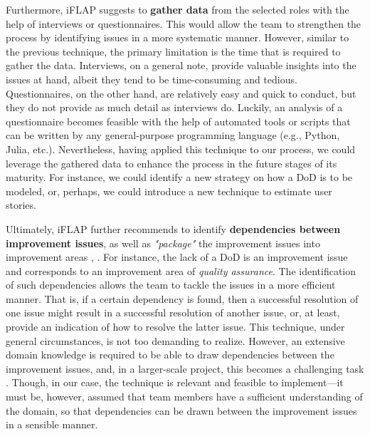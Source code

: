 \documentclass[conference]{IEEEtran}
\begin{document}
Furthermore, iFLAP suggests to \textbf{gather data} from the selected roles
with the help of interviews or questionnaires. This would allow the team to
strengthen the process by identifying issues in a more systematic manner.
However, similar to the previous technique, the primary limitation is the time
that is required to gather the data. Interviews, on a general note, provide
valuable insights into the issues at hand, albeit they tend to be
time-consuming and tedious. Questionnaires, on the other hand, are relatively
easy and quick to conduct, but they do not provide as much detail as interviews
do. Luckily, an analysis of a questionnaire becomes feasible with the help of
automated tools or scripts that can be written by any general-purpose
programming language (e.g., Python, Julia, etc.). Nevertheless, having applied
this technique to our process, we could leverage the gathered data to enhance
the process in the future stages of its maturity. For instance, we could
identify a new strategy on how a DoD is to be modeled, or, perhaps, we could
introduce a new technique to estimate user stories.

Ultimately, iFLAP further recommends to identify \textbf{dependencies between
improvement issues}, as well as \textit{"package"} the improvement issues into
improvement areas \cite{Pettersson2008}, \cite{Malvius2009}. For instance, the
lack of a DoD is an improvement issue and corresponds to an improvement area of
\textit{quality assurance}. The identification of such dependencies allows the
team to tackle the issues in a more efficient manner. That is, if a certain
dependency is found, then a successful resolution of one issue might result in
a successful resolution of another issue, or, at least, provide an indication
of how to resolve the latter issue. This technique, under general
circumstances, is not too demanding to realize. However, an extensive domain
knowledge is required to be able to draw dependencies between the improvement
issues, and, in a larger-scale project, this becomes a challenging task
\cite{Pettersson2008}. Though, in our case, the technique is relevant and
feasible to implement---it must be, however, assumed that team members have a
sufficient understanding of the domain, so that dependencies can be drawn
between the improvement issues in a sensible manner.

\end{document}
